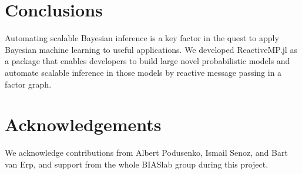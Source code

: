 \documentclass{juliacon}
\begin{document}
\section{Conclusions}

Automating scalable Bayesian inference is a key factor in the quest to apply Bayesian machine learning to useful applications. We developed ReactiveMP.jl as 
a package that enables developers to build large novel probabilistic models and automate scalable inference in those models by reactive message passing in a factor graph. 

\section{Acknowledgements}

We acknowledge contributions from Albert Podusenko, Ismail Senoz, and Bart van Erp, and support from the whole BIASlab group during this project.


\end{document}
